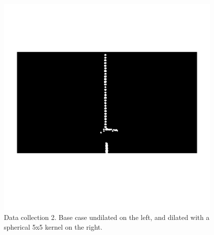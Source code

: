\begin{figure}[H]
\begin{minipage}[t]{0.48\textwidth}
		\includegraphics[width=1.0\textwidth]{figures/ImageAnalysis/dilation/base2_dilation.png}
	\end{minipage}
	\setlength{\abovecaptionskip}{-40pt}
	\caption{Data collection 2. Base case undilated on the left, and dilated with a spherical 5x5 kernel on the right.}
	\label{fig:dilate_base2}
\end{figure}
 \vspace{-1.5cm}
